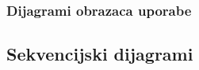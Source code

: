 	
						
	

						
						
	
								
							
     
				\subsubsection{Dijagrami obrazaca uporabe}
					
				\eject		
				
			\subsection{Sekvencijski dijagrami}
				
